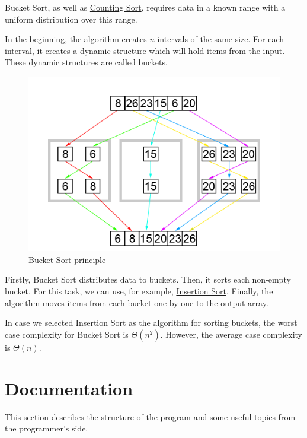 \documentclass[
  field=inf,
  biblatex,
  language=english,
  glossaries,
  theorems=false,
  sourcecodes=false,
  index
]{kidiplom}
\begin{document}
Bucket Sort, as well as \hyperref[sec:counting]{Counting Sort}, requires data in a known range with a uniform distribution over this range.

In the beginning, the algorithm creates $n$ intervals of the same size. For each interval, it creates a dynamic structure which will hold items from the input. These dynamic structures are called buckets.

\begin{figure}[H]
\begin{center}
	
	\includegraphics[scale=0.3]{img/Bucketsort.png}
	\caption{Bucket Sort principle}\label{fig:bucketsort}
\end{center}
\end{figure}

Firstly, Bucket Sort distributes data to buckets. Then, it sorts each non-empty bucket. For this task, we can use, for example, \hyperref[sec:insertion]{Insertion Sort}. Finally, the algorithm moves items from each bucket one by one to the output array. 

In case we selected Insertion Sort as the algorithm for sorting buckets, the worst case complexity for Bucket Sort is $\Theta(n^2)$. However, the average case complexity is $\Theta(n)$.


\newpage
\section{Documentation}

This section describes the structure of the program and some useful topics from the programmer's side. 
\end{document}
